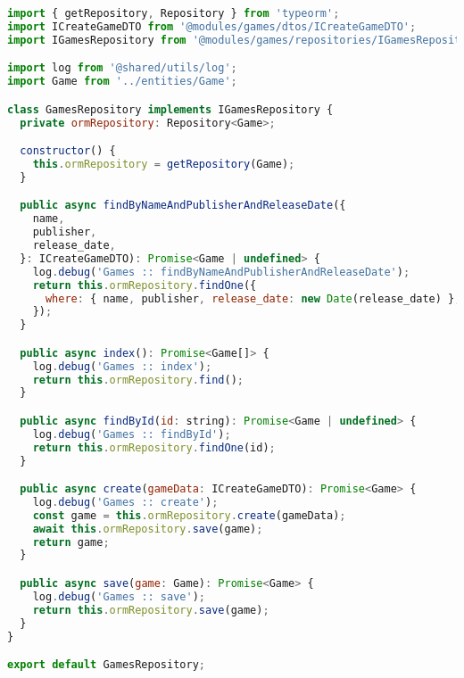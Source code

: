 \begin{lstlisting}[language=JavaScript, caption={GamesRepository},captionpos=b, label=alg:gamerepository]
import { getRepository, Repository } from 'typeorm';
import ICreateGameDTO from '@modules/games/dtos/ICreateGameDTO';
import IGamesRepository from '@modules/games/repositories/IGamesRepository';

import log from '@shared/utils/log';
import Game from '../entities/Game';

class GamesRepository implements IGamesRepository {
  private ormRepository: Repository<Game>;

  constructor() {
    this.ormRepository = getRepository(Game);
  }

  public async findByNameAndPublisherAndReleaseDate({
    name,
    publisher,
    release_date,
  }: ICreateGameDTO): Promise<Game | undefined> {
    log.debug('Games :: findByNameAndPublisherAndReleaseDate');
    return this.ormRepository.findOne({
      where: { name, publisher, release_date: new Date(release_date) },
    });
  }

  public async index(): Promise<Game[]> {
    log.debug('Games :: index');
    return this.ormRepository.find();
  }

  public async findById(id: string): Promise<Game | undefined> {
    log.debug('Games :: findById');
    return this.ormRepository.findOne(id);
  }

  public async create(gameData: ICreateGameDTO): Promise<Game> {
    log.debug('Games :: create');
    const game = this.ormRepository.create(gameData);
    await this.ormRepository.save(game);
    return game;
  }

  public async save(game: Game): Promise<Game> {
    log.debug('Games :: save');
    return this.ormRepository.save(game);
  }
}

export default GamesRepository;

\end{lstlisting}